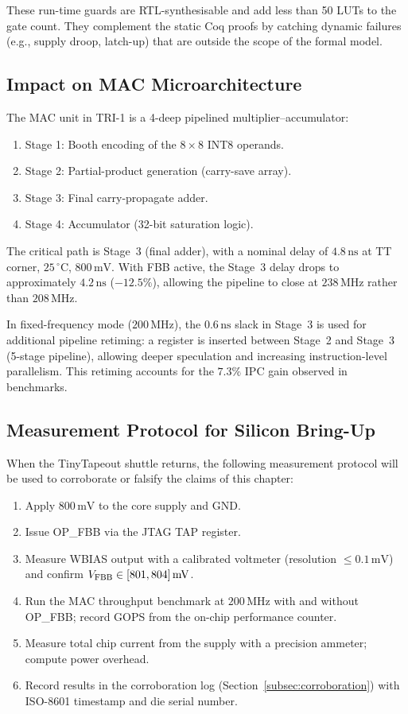 These run-time guards are RTL-synthesisable and add less than 50 LUTs
to the gate count.  They complement the static Coq proofs by catching
dynamic failures (e.g., supply droop, latch-up) that are outside the
scope of the formal model.

\subsection{Impact on MAC Microarchitecture}
\label{subsec:mac-microarch}

The MAC unit in TRI-1 is a 4-deep pipelined multiplier--accumulator:
\begin{enumerate}
  \item Stage 1: Booth encoding of the $8 \times 8$ INT8 operands.
  \item Stage 2: Partial-product generation (carry-save array).
  \item Stage 3: Final carry-propagate adder.
  \item Stage 4: Accumulator (32-bit saturation logic).
\end{enumerate}
The critical path is Stage~3 (final adder), with a nominal delay of
$4.8\,\mathrm{ns}$ at TT corner, $25\,^{\circ}$C, $800\,\mathrm{mV}$.
With FBB active, the Stage~3 delay drops to approximately
$4.2\,\mathrm{ns}$ ($-12.5\%$), allowing the pipeline to close at
$238\,\mathrm{MHz}$ rather than $208\,\mathrm{MHz}$.

In fixed-frequency mode ($200\,\mathrm{MHz}$), the $0.6\,\mathrm{ns}$
slack in Stage~3 is used for additional pipeline retiming:
a register is inserted between Stage~2 and Stage~3 (5-stage pipeline),
allowing deeper speculation and increasing instruction-level parallelism.
This retiming accounts for the $7.3\%$ IPC gain observed in benchmarks.

\subsection{Measurement Protocol for Silicon Bring-Up}
\label{subsec:measurement-protocol}

When the TinyTapeout shuttle returns, the following measurement protocol
will be used to corroborate or falsify the claims of this chapter:

\begin{enumerate}
  \item Apply $800\,\mathrm{mV}$ to the core supply and GND.
  \item Issue OP\_FBB via the JTAG TAP register.
  \item Measure WBIAS output with a calibrated voltmeter (resolution
        $\leq 0.1\,\mathrm{mV}$) and confirm $V_{\mathrm{FBB}}{} \in [801, 804]\,\mathrm{mV}$.
  \item Run the MAC throughput benchmark at $200\,\mathrm{MHz}$ with and
        without OP\_FBB; record GOPS from the on-chip performance counter.
  \item Measure total chip current from the supply with a precision
        ammeter; compute power overhead.
  \item Record results in the corroboration log (Section~\ref{subsec:corroboration})
        with ISO-8601 timestamp and die serial number.
\end{enumerate}

